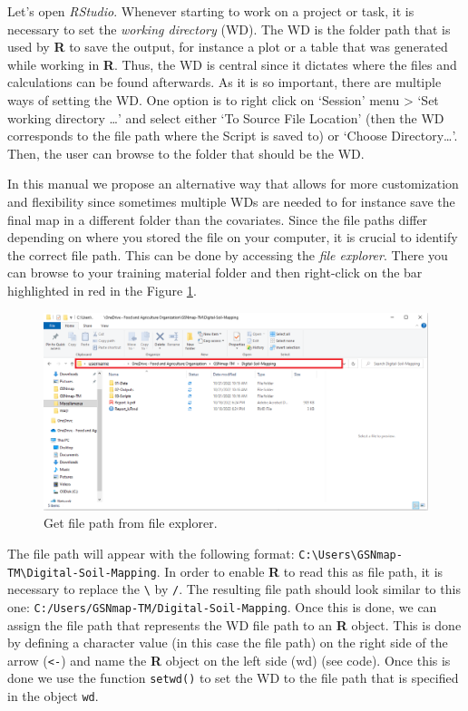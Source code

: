 \documentclass[
  10pt,
  b5paper,
  oneside]{book}
\begin{document}
Let's open \emph{RStudio}. Whenever starting to work on a project or task, it is necessary to set the \emph{working directory} (WD). The WD is the folder path that is used by \textbf{R} to save the output, for instance a plot or a table that was generated while working in \textbf{R}. Thus, the WD is central since it dictates where the files and calculations can be found afterwards. As it is so important, there are multiple ways of setting the WD.
One option is to right click on `Session' menu \textgreater{} `Set working directory \ldots{}' and select either `To Source File Location' (then the WD corresponds to the file path where the Script is saved to) or `Choose Directory\ldots{}'. Then, the user can browse to the folder that should be the WD.

In this manual we propose an alternative way that allows for more customization and flexibility since sometimes multiple WDs are needed to for instance save the final map in a different folder than the covariates. Since the file paths differ depending on where you stored the file on your computer, it is crucial to identify the correct file path. This can be done by accessing the \emph{file explorer}. There you can browse to your training material folder and then right-click on the bar highlighted in red in the Figure \ref{fig:explorer}.

\begin{figure}
\includegraphics[width=17.42in]{images/file-explorer} \caption{Get file path from file explorer.}\label{fig:explorer}
\end{figure}

The file path will appear with the following format: \texttt{C:\textbackslash{}Users\textbackslash{}GSNmap-TM\textbackslash{}Digital-Soil-Mapping}. In order to enable \textbf{R} to read this as file path, it is necessary to replace the \texttt{\textbackslash{}} by \texttt{/}. The resulting file path should look similar to this one: \texttt{C:/Users/GSNmap-TM/Digital-Soil-Mapping}. Once this is done, we can assign the file path that represents the WD file path to an \textbf{R} object. This is done by defining a character value (in this case the file path) on the right side of the arrow (\texttt{\textless{}-}) and name the \textbf{R} object on the left side (wd) (see code). Once this is done we use the function \texttt{setwd()} to set the WD to the file path that is specified in the object \texttt{wd}.
\end{document}
